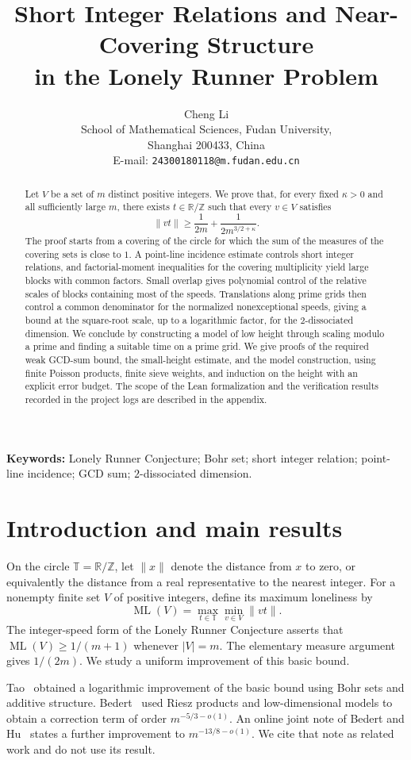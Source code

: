 \documentclass[12pt,leqno]{article}
\title{Short Integer Relations and Near-Covering Structure\\
in the Lonely Runner Problem}
\author{Cheng Li\\
\footnotesize School of Mathematical Sciences, Fudan University,\\
\footnotesize Shanghai 200433, China\\
\footnotesize E-mail: \texttt{24300180118@m.fudan.edu.cn}}
\date{}
\numberwithin{equation}{section}
\theoremstyle{remark}
\newcommand{\LRtorus}{\mathbb T}
\newcommand{\LRinteger}{\mathbb Z}
\newcommand{\LRreal}{\mathbb R}
\newcommand{\LRloneliness}{\operatorname{ML}}
\begin{document}
\maketitle
\begin{abstract}
Let $V$ be a set of $m$ distinct positive integers. We prove that, for every fixed $\kappa>0$ and all sufficiently large $m$, there exists $t\in\mathbb R/\mathbb Z$ such that every $v\in V$ satisfies
\[
\|vt\|\ge \frac1{2m}+\frac1{2m^{3/2+\kappa}}.
\]
The proof starts from a covering of the circle for which the sum of the measures of the covering sets is close to $1$. A point-line incidence estimate controls short integer relations, and factorial-moment inequalities for the covering multiplicity yield large blocks with common factors. Small overlap gives polynomial control of the relative scales of blocks containing most of the speeds. Translations along prime grids then control a common denominator for the normalized nonexceptional speeds, giving a bound at the square-root scale, up to a logarithmic factor, for the $2$-dissociated dimension. We conclude by constructing a model of low height through scaling modulo a prime and finding a suitable time on a prime grid. We give proofs of the required weak GCD-sum bound, the small-height estimate, and the model construction, using finite Poisson products, finite sieve weights, and induction on the height with an explicit error budget. The scope of the Lean formalization and the verification results recorded in the project logs are described in the appendix.
\end{abstract}
\noindent\textbf{Keywords:} Lonely Runner Conjecture; Bohr set; short integer relation; point-line incidence; GCD sum; $2$-dissociated dimension.\vskip 1cm

\section{Introduction and main results}
On the circle $\LRtorus=\LRreal/\LRinteger$, let $\|x\|$ denote the distance from $x$ to zero, or equivalently the distance from a real representative to the nearest integer. For a nonempty finite set $V$ of positive integers, define its maximum loneliness by
\[
\LRloneliness(V)=\max_{t\in\LRtorus}\min_{v\in V}\|vt\|.
\]
The integer-speed form of the Lonely Runner Conjecture asserts that $\LRloneliness(V)\ge1/(m+1)$ whenever $|V|=m$. The elementary measure argument gives $1/(2m)$. We study a uniform improvement of this basic bound.

Tao~\cite{Tao} obtained a logarithmic improvement of the basic bound using Bohr sets and additive structure. Bedert~\cite{Bedert} used Riesz products and low-dimensional models to obtain a correction term of order $m^{-5/3-o(1)}$. An online joint note of Bedert and Hu~\cite{BH} states a further improvement to $m^{-13/8-o(1)}$. We cite that note as related work and do not use its result.
\end{document}
